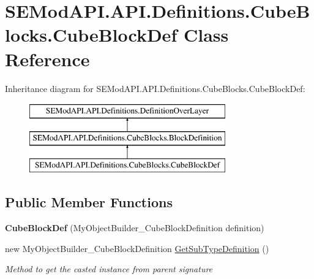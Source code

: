 \hypertarget{class_s_e_mod_a_p_i_1_1_a_p_i_1_1_definitions_1_1_cube_blocks_1_1_cube_block_def}{}\section{S\+E\+Mod\+A\+P\+I.\+A\+P\+I.\+Definitions.\+Cube\+Blocks.\+Cube\+Block\+Def Class Reference}
\label{class_s_e_mod_a_p_i_1_1_a_p_i_1_1_definitions_1_1_cube_blocks_1_1_cube_block_def}
Inheritance diagram for S\+E\+Mod\+A\+P\+I.\+A\+P\+I.\+Definitions.\+Cube\+Blocks.\+Cube\+Block\+Def\+:\begin{figure}[H]
\begin{center}
\leavevmode
\includegraphics[height=3.000000cm]{class_s_e_mod_a_p_i_1_1_a_p_i_1_1_definitions_1_1_cube_blocks_1_1_cube_block_def}
\end{center}
\end{figure}
\subsection*{Public Member Functions}
\begin{DoxyCompactItemize}
\item 
\hypertarget{class_s_e_mod_a_p_i_1_1_a_p_i_1_1_definitions_1_1_cube_blocks_1_1_cube_block_def_a2bb520c492314a2a2dfe030dcebe1f08}{}{\bfseries Cube\+Block\+Def} (My\+Object\+Builder\+\_\+\+Cube\+Block\+Definition definition)\label{class_s_e_mod_a_p_i_1_1_a_p_i_1_1_definitions_1_1_cube_blocks_1_1_cube_block_def_a2bb520c492314a2a2dfe030dcebe1f08}

\item 
new My\+Object\+Builder\+\_\+\+Cube\+Block\+Definition \hyperlink{class_s_e_mod_a_p_i_1_1_a_p_i_1_1_definitions_1_1_cube_blocks_1_1_cube_block_def_aee16945263b0a381e7682454b4509811}{Get\+Sub\+Type\+Definition} ()
\begin{DoxyCompactList}\small\item\em Method to get the casted instance from parent signature \end{DoxyCompactList}\end{DoxyCompactItemize}
